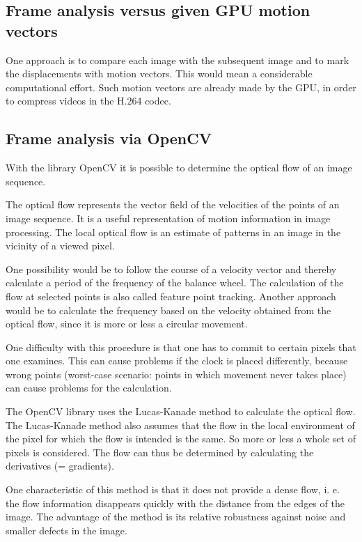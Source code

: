 \documentclass[12pt, a4paper]{report}
\begin{document}
    \subsection{Frame analysis versus given GPU motion vectors}
    One approach is to compare each image with the subsequent image and to mark the displacements with motion vectors. This would mean a considerable computational effort.
    Such motion vectors are already made by the GPU, in order to compress videos in the H.264 codec.
    
    \subsection{Frame analysis via OpenCV}
    With the library OpenCV it is possible to determine the optical flow of an image sequence. 
    
    The optical flow represents the vector field of the velocities of the points of an image sequence. It is a useful representation of motion information in image processing. The local optical flow is an estimate of patterns in an image in the vicinity of a viewed pixel. 
    
    One possibility would be to follow the course of a velocity vector and thereby calculate a period of the frequency of the balance wheel. The calculation of the flow at selected points is also called feature point tracking. Another approach would be to calculate the frequency based on the velocity obtained from the optical flow, since it is more or less a circular movement. 
    
    One difficulty with this procedure is that one has to commit to certain pixels that one examines. This can cause problems if the clock is placed differently, because wrong points (worst-case scenario: points in which movement never takes place) can cause problems for the calculation.  
    
    The OpenCV library uses the Lucas-Kanade method to calculate the optical flow. The Lucas-Kanade method also assumes that the flow in the local environment of the pixel for which the flow is intended is the same. So more or less a whole set of pixels is considered. The flow can thus be determined by calculating the derivatives (= gradients). 
    
    One characteristic of this method is that it does not provide a dense flow, i. e. the flow information disappears quickly with the distance from the edges of the image. The advantage of the method is its relative robustness against noise and smaller defects in the image.
    
\end{document}
